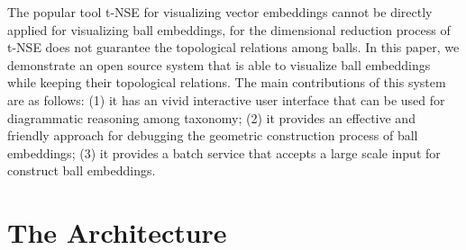 \documentclass[]{article}
\begin{document}


The popular  tool t-NSE \cite{Maaten08} for visualizing vector embeddings cannot be directly applied for visualizing ball embeddings, for the dimensional reduction process of t-NSE does not guarantee the topological relations among balls. In this paper, we demonstrate an open source system that is able to visualize ball embeddings while keeping their topological relations. The main contributions of this system are as follows: (1) it has an vivid interactive user interface that can be used for diagrammatic reasoning among taxonomy; (2) it provides an effective and friendly approach for debugging the geometric construction process of ball embeddings; (3) it provides a batch service that accepts a large scale input for construct ball embeddings. 

\section{The Architecture}
\end{document}

